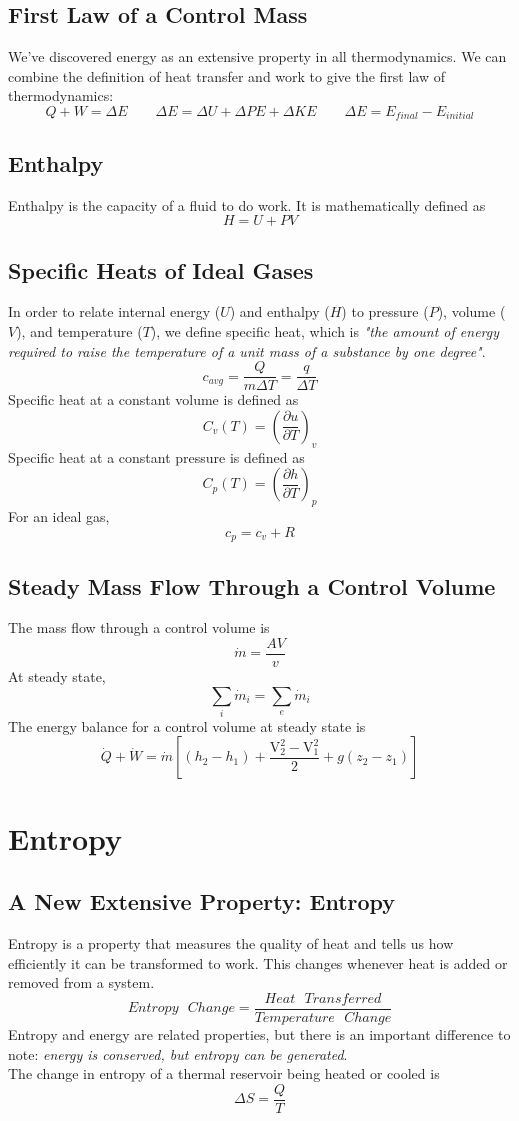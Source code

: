 \documentclass[11pt]{article}
\begin{document}
\subsection{First Law of a Control Mass}
We've discovered energy as an extensive property in all thermodynamics. We can combine the definition of heat transfer and work  to give the first law of thermodynamics:
$$ Q + W = \Delta E \quad \quad \Delta E = \Delta U + \Delta PE + \Delta KE \quad \quad \Delta E = E_{final} - E_{initial}$$
\subsection{Enthalpy}
Enthalpy is the capacity of a fluid to do work. It is mathematically defined as $$ H = U + PV$$
\subsection{Specific Heats of Ideal Gases}
In order to relate internal energy ($U$) and enthalpy ($H$) to pressure ($P$), volume ($V$), and temperature ($T$), we define specific heat, which is \textit{"the amount of energy required to raise the temperature of a unit mass of a substance by one degree"}.
$$ c_{avg} = \frac{Q}{m \Delta T} = \frac{q}{\Delta T}$$
Specific heat at a constant volume is defined as 
$$ C_v(T) = \left(\frac{\partial u}{\partial T}\right)_v$$
Specific heat at a constant pressure is defined as 
$$ C_p(T) = \left(\frac{\partial h}{\partial T}\right)_p$$
For an ideal gas,
$$ c_p = c_v + R $$
\subsection{Steady Mass Flow Through a Control Volume}
The mass flow through a control volume is 
$$ \dot m = \frac{AV}{v}$$
At steady state,
$$ \sum_{i} \dot m_i = \sum_{e} \dot m_i $$
The energy balance for a control volume at steady state is 
$$ \dot Q + \dot W = \dot m \left[(h_2-h_1) + \frac{\text{V}_2^2 - \text{V}_1^2}{2} + g(z_2 - z_1)\right]$$
\pagebreak
\section{Entropy}
\subsection{A New Extensive Property: Entropy}
Entropy is a property that measures the quality of heat and tells us how efficiently it can be transformed to work. This changes whenever heat is added or removed from a system.
$$ Entropy \text{ } Change = \frac{Heat \text{ }Transferred}{Temperature \text{ }Change}$$
Entropy and energy are related properties, but there is an important difference to note: \textit{energy is conserved, but entropy can be generated}. \\
The change in entropy of a thermal reservoir being heated or cooled is
$$ \Delta S = \frac{Q}{T}$$
\end{document}
